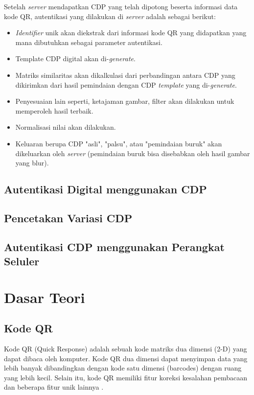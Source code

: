 Setelah \emph{server} mendapatkan CDP yang telah dipotong beserta informasi data kode QR, autentikasi yang dilakukan di \emph{server} adalah sebagai berikut:

\begin{itemize}
	\item \emph{Identifier} unik akan diekstrak dari informasi kode QR yang didapatkan yang mana dibutuhkan sebagai parameter autentikasi.
	\item Template CDP digital akan di-\emph{generate}.
	\item Matriks similaritas akan dikalkulasi dari perbandingan antara CDP yang dikirimkan dari hasil pemindaian dengan CDP \emph{template} yang di-\emph{generate}.
	\item Penyesuaian lain seperti, ketajaman gambar, filter akan dilakukan untuk memperoleh hasil terbaik.
	\item Normalisasi nilai akan dilakukan.
	\item Keluaran berupa CDP "asli", "palsu", atau "pemindaian buruk" akan dikeluarkan oleh \emph{server} (pemindaian buruk bisa disebabkan oleh hasil gambar yang blur).
\end{itemize}

\subsection{Autentikasi Digital menggunakan CDP}

\subsection{Pencetakan Variasi CDP}

\subsection{Autentikasi CDP menggunakan Perangkat Seluler}

\section{Dasar Teori}

\subsection{Kode QR}

Kode QR (Quick Response) adalah sebuah kode matriks dua dimensi (2-D) yang dapat dibaca oleh komputer. Kode QR dua dimensi dapat menyimpan data yang lebih banyak dibandingkan dengan kode satu dimensi (barcodes) dengan ruang yang lebih kecil. Selain itu, kode QR memiliki fitur koreksi kesalahan pembacaan dan beberapa fitur unik lainnya \cite{densoqrcode}. 

